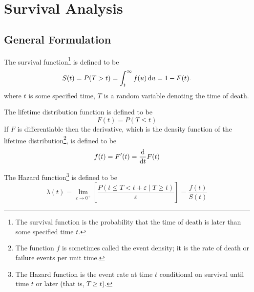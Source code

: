 \chapter{Survival Analysis}

\section{General Formulation}

\begin{definition}
	The survival function\footnote{The survival function is the probability that the time of death is later than some specified time \(t\).} is defined to be
	\begin{equation}
		S(t)=P(T>t)=\int_{t}^{\infty}f(u)\mathop{}\!\mathrm{d} u=1-F(t).
	\end{equation}
	where \(t\) is some specified time, \(T\) is a random variable denoting the time of death.
\end{definition}

\begin{definition}
	The lifetime distribution function is defined to be
	\begin{equation}
		F(t)=P(T\leq t)
	\end{equation}
	If \(F\) is differentiable then the derivative, which is the density function of the lifetime distribution\footnote{The function \(f\) is sometimes called the event density; it is the rate of death or failure events per unit time.}, is defined to be
	\begin{equation}
		f(t)=F^{\prime}(t)=\frac{\mathop{}\!\mathrm{d}}{\mathop{}\!\mathrm{d} t}F(t)
	\end{equation}
\end{definition}

\begin{definition}
	The Hazard function\footnote{The Hazard function is the event rate at time \(t\) conditional on survival until time \(t\) or later (that is, \(T\geq t\)).} is defined to be
	\begin{equation}
		\lambda(t)=\lim_{\varepsilon\rightarrow 0^{+}}\left[\frac{P(t\leq T<t+\varepsilon\mid T\geq t)}{\varepsilon}\right]=\frac{f(t)}{S(t)}
	\end{equation}
\end{definition}

